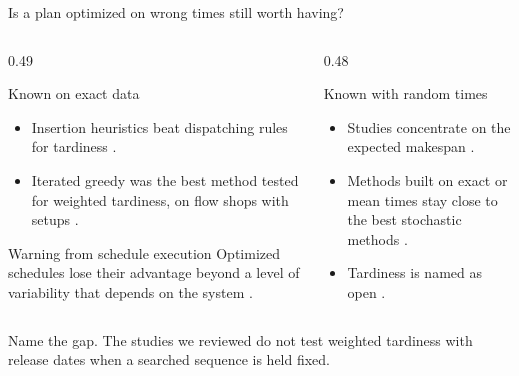 \documentclass[aspectratio=169,11pt]{beamer}
\renewcommand{\fine}{\unskip\space}
\newcommand{\point}[2]{\par\medskip\sumpara #1\sumparaend
  {\color{uablue}\fin #2\fine}\par}
\begin{document}
\begin{frame}{Is a plan optimized on wrong times still worth having?}
\begin{columns}[T,onlytextwidth]
\begin{column}{0.49\textwidth}
\begin{block}{Known on exact data}
\small
\begin{itemize}
\item Insertion heuristics beat dispatching rules for tardiness \cite{vallada2008review}.
\item Iterated greedy was the best method tested for weighted tardiness, on flow shops with setups \cite{ruiz2008igwt}.
\end{itemize}
\end{block}
\begin{block}{Warning from schedule execution}
\small
Optimized schedules lose their advantage beyond a level of variability that depends on the system \cite{aytug2005executing}.
\end{block}
\end{column}
\begin{column}{0.48\textwidth}
\begin{block}{Known with random times}
\small
\begin{itemize}
\item Studies concentrate on the expected makespan \cite{gonzalezneira2017review}.
\item Methods built on exact or mean times stay close to the best stochastic methods \cite{baker2012stochastic,framinan2015stochastic,juan2014simheuristic}.
\item Tardiness is named as open \cite{baker2012stochastic,gonzalezneira2017review}.
\end{itemize}
\end{block}
\end{column}
\end{columns}
\point{Name the gap.}{The studies we reviewed do not test weighted tardiness with release dates when a searched sequence is held fixed.}
\end{frame}
\end{document}
